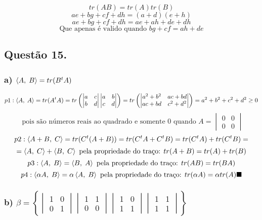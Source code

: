 \documentclass[12pt]{article}
\begin{document}
\[tr(AB) = tr(A)tr(B)\]
\[ae+bg+cf+dh = (a+d)(e+h)\]
\[ae+bg+cf+dh = ae+ah+de+dh\]
\[\text{Que apenas é valido quando } bg+cf = ah+de\]

\subsection{Questão 15.}
\subsubsection{a) $\left\langle A,\;B\right\rangle = tr(B^{t}A)$}

\[p1: \left\langle A,\;A\right\rangle = tr(A^{t}A) = tr\left( \begin{vmatrix} a&c \\ b&d \end{vmatrix} \begin{vmatrix} a&b \\ c&d \end{vmatrix} \right) = tr\left( \begin{vmatrix} a^{2}+b^{2}&ac+bd \\ ac+bd&c^{2}+d^{2} \end{vmatrix} \right) = a^{2}+b^{2}+c^{2}+d^{2} \geq 0\]
\[\text{ pois são números reais ao quadrado e somente } 0 \text{ quando } A = \begin{vmatrix} 0&0 \\ 0&0 \end{vmatrix}\]
\[p2: \left\langle A+B,\;C\right\rangle = tr(C^{t}(A+B)) = tr(C^{t}A + C^{t}B) = tr(C^{t}A) + tr(C^{t}B) =\]
\[ = \left\langle A,\;C\right\rangle + \left\langle B,\;C\right\rangle \text{ pela propriedade do traço: } tr(A+B) = tr(A)+tr(B)\]
\[p3: \left\langle A,\;B\right\rangle = \left\langle B,\;A\right\rangle \text{ pela propriedade do traço: } tr(AB) = tr(BA)\]
\[p4: \p{\alpha A}{B}= \alpha \p{A}{B} \text{ pela propriedade do traço: } tr(\alpha A) = \alpha tr(A) \hfill \blacksquare\]

\subsubsection{b) $\beta = \left\lbrace \begin{vmatrix} 1&0 \\ 0&1 \end{vmatrix} \begin{vmatrix} 1&1 \\ 0&0 \end{vmatrix} \begin{vmatrix} 1&0 \\ 1&1 \end{vmatrix} \begin{vmatrix} 1&1 \\ 1&1 \end{vmatrix} \right\rbrace$}
\end{document}
